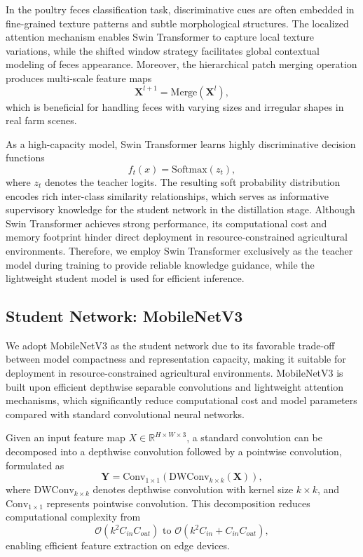 \documentclass[review]{elsarticle}
\begin{document}
In the poultry feces classification task, discriminative cues are often embedded in fine-grained texture patterns and subtle morphological structures. The localized attention mechanism enables Swin Transformer to capture local texture variations, while the shifted window strategy facilitates global contextual modeling of feces appearance. Moreover, the hierarchical patch merging operation produces multi-scale feature maps 
\begin{equation}
\mathbf{X}^{l+1} = \text{Merge}(\mathbf{X}^l),
\label{eq:patch_merge}
\end{equation}
which is beneficial for handling feces with varying sizes and irregular shapes in real farm scenes.

As a high-capacity model, Swin Transformer learns highly discriminative decision functions
\begin{equation}
f_{t}(x) = \text{Softmax}(z_t),
\label{eq:teacher_output}
\end{equation}
where $z_t$ denotes the teacher logits. The resulting soft probability distribution encodes rich inter-class similarity relationships, which serves as informative supervisory knowledge for the student network in the distillation stage. Although Swin Transformer achieves strong performance, its computational cost and memory footprint hinder direct deployment in resource-constrained agricultural environments. Therefore, we employ Swin Transformer exclusively as the teacher model during training to provide reliable knowledge guidance, while the lightweight student model is used for efficient inference.

\subsection{Student Network: MobileNetV3}
We adopt MobileNetV3 as the student network due to its favorable trade-off between model compactness and representation capacity, making it suitable for deployment in resource-constrained agricultural environments. MobileNetV3 is built upon efficient depthwise separable convolutions and lightweight attention mechanisms, which significantly reduce computational cost and model parameters compared with standard convolutional neural networks.

Given an input feature map $X \in \mathbb{R}^{H \times W \times 3}$, a standard convolution can be decomposed into a depthwise convolution followed by a pointwise convolution, formulated as
\begin{equation}
\mathbf{Y} = \text{Conv}_{1 \times 1}(\text{DWConv}_{k \times k}(\mathbf{X})),
\label{eq:depthwise_separable}
\end{equation}
where $\text{DWConv}_{k \times k}$ denotes depthwise convolution with kernel size $k \times k$, and $\text{Conv}_{1 \times 1}$ represents pointwise convolution. This decomposition reduces computational complexity from
\begin{equation}
\mathcal{O}(k^2 C_{in} C_{out}) \text{ to } \mathcal{O}(k^2 C_{in} + C_{in} C_{out}),
\label{eq:complexity_optimization}
\end{equation}
enabling efficient feature extraction on edge devices.
\end{document}
